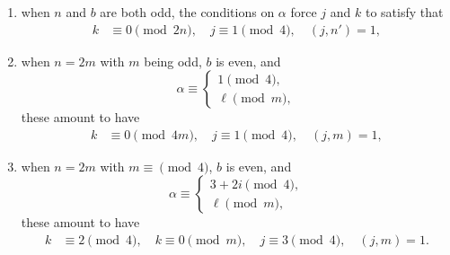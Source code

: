\documentclass[11pt, reqno]{amsart}
\theoremstyle{plain}
\theoremstyle{definition}
\numberwithin{equation}{section}
\begin{document}
\begin{enumerate}
    \item when $n$ and $b$ are both odd, the conditions on $\alpha$ force $j$ and $k$ to satisfy that
    \begin{align*}
    k&\equiv0\pmod{2n},\quad j\equiv 1\pmod{4},\quad (j,n')=1,
\end{align*}

\item when $n=2m$ with $m$ being odd, $b$ is even, and
$$
\alpha\equiv\begin{cases}
    1\pmod{4},\\
    \ell\pmod{m},
\end{cases}
$$
these amount to have 
 \begin{align*}
    k&\equiv0\pmod{4m},\quad j\equiv 1\pmod{4},\quad (j,m)=1,
\end{align*}

\item when $n=2m$ with $m\equiv\pmod{4}$, $b$ is even, and
$$
\alpha\equiv\begin{cases}
    3+2i\pmod{4},\\
    \ell\pmod{m},
\end{cases}
$$
these amount to have
 \begin{align*}
    k&\equiv2\pmod{4},\quad k\equiv0\pmod{m},\quad j\equiv 3\pmod{4},\quad (j,m)=1.
\end{align*}
\end{enumerate}
\end{document}
